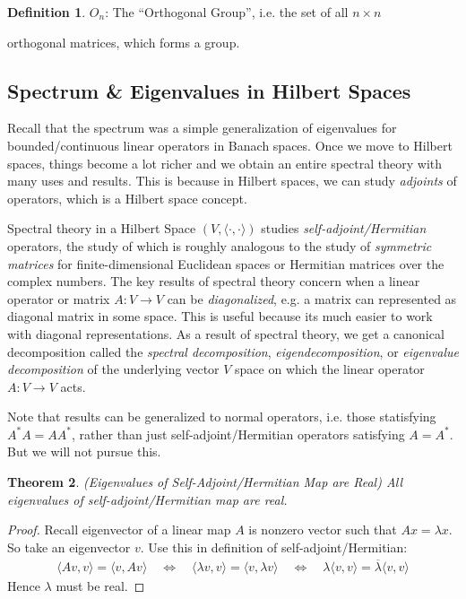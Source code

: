 \documentclass[12pt]{book}
\numberwithin{equation}{section} %
\theoremstyle{plain}
\newtheorem{thm}{Theorem}[section]
\theoremstyle{definition}
\newtheorem{defn}[thm]{Definition}
\theoremstyle{remark}
\newcommand{\ra}{\rightarrow}
\begin{document}
\begin{defn}
$O_n$: The ``Orthogonal Group'', i.e. the set of all $n\times n$

orthogonal matrices, which forms a group.
\end{defn}





\clearpage
\subsection{Spectrum \& Eigenvalues in Hilbert Spaces}

Recall that the spectrum was a simple generalization of eigenvalues for
bounded/continuous linear operators in Banach spaces.
Once we move to Hilbert spaces, things become a lot richer and we obtain
an entire spectral theory with many uses and results.
This is because in Hilbert spaces, we can study \emph{adjoints} of
operators, which is a Hilbert space concept.

Spectral theory in a Hilbert Space $(V,\langle\cdot,\cdot\rangle)$
studies \emph{self-adjoint/Hermitian} operators, the study of which is
roughly analogous to the study of \emph{symmetric matrices} for
finite-dimensional Euclidean spaces or Hermitian matrices over the
complex numbers.
The key results of spectral theory concern when a linear operator or
matrix $A:V\ra V$ can be \emph{diagonalized}, e.g. a matrix can
represented as diagonal matrix in some space.
This is useful because its much easier to work with diagonal
representations.
As a result of spectral theory, we get a canonical decomposition called
the \emph{spectral decomposition}, \emph{eigendecomposition}, or
\emph{eigenvalue decomposition} of the underlying vector $V$ space on
which the linear operator $A:V\ra V$ acts.

Note that results can be generalized to normal operators, i.e. those
statisfying $A^*A=AA^*$, rather than just self-adjoint/Hermitian
operators satisfying $A=A^*$.
But we will not pursue this.





\begin{thm}
\emph{(Eigenvalues of Self-Adjoint/Hermitian Map are Real)}
All eigenvalues of self-adjoint/Hermitian map are real.
\end{thm}
\begin{proof}
Recall eigenvector of a linear map $A$ is nonzero vector such that
$Ax = \lambda x$.
So take an eigenvector $v$.
Use this in definition of self-adjoint/Hermitian:
\begin{align*}
\langle Av, v\rangle = \langle v,Av\rangle
\quad\iff\quad
\langle \lambda v, v\rangle = \langle v,\lambda v\rangle
\quad\iff\quad
\lambda \langle v, v\rangle = \overline{\lambda} \langle v,v\rangle
\end{align*}
Hence $\lambda$ must be real.
\end{proof}
\end{document}
